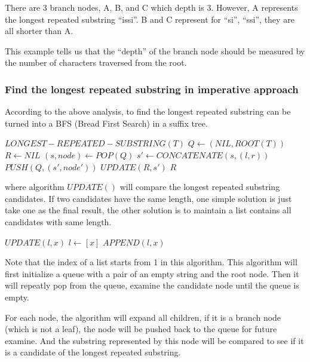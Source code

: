 \documentclass{article}
\begin{document}
There are 3 branch nodes, A, B, and C which depth is 3. However, A represents
the longest repeated substring ``issi''. B and C represent for ``si'', ``ssi'',
they are all shorter than A. 

This example tells us that the ``depth'' of the branch node should be measured
by the number of characters traversed from the root.

\subsubsection{Find the longest repeated substring in imperative approach}
According to the above analysis, to find the longest repeated substring
can be turned into a BFS (Bread First Search) in a suffix tree.

\begin{algorithmic}
\STATE $LONGEST-REPEATED-SUBSTRING(T)$
  \STATE $Q \leftarrow (NIL, ROOT(T))$
  \STATE $R \leftarrow NIL$
    \STATE $(s, node) \leftarrow POP(Q)$
        \STATE $s' \leftarrow CONCATENATE(s, (l, r))$
        \STATE $PUSH(Q, (s', node'))$
        \STATE $UPDATE(R, s')$
      \ENDIF
    \ENDFOR
  \ENDWHILE
  \RETURN $R$
\end{algorithmic}

where algorithm $UPDATE()$ will compare the longest repeated substring
candidates. If two candidates have the same length, one simple solution
is just take one as the final result, the other solution is to maintain
a list contains all candidates with same length.

\begin{algorithmic}
\STATE $UPDATE(l, x)$
    \RETURN $l \leftarrow [x]$
    \RETURN $APPEND(l, x)$
  \ENDIF
\end{algorithmic}

Note that the index of a list starts from 1 in this algorithm.
This algorithm will first initialize a queue with a pair of an
empty string and the root node. Then it will repeatly pop from
the queue, examine the candidate node until the queue is empty.

For each node, the algorithm will expand all children, if it is 
a branch node (which is not a leaf), the node will be pushed back
to the queue for future examine. And the substring represented
by this node will be compared to see if it is a candidate of the
longest repeated substring.
\end{document}
